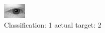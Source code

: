 \begin{figure}[h!]
\begin{center}
\includegraphics[width=0.60\columnwidth]{figures/ID345_class_1_target_2.png}
\end{center}
\caption{ Classification: 1 actual target: 2}
\label{fig:ID345_class_1_target_2}
\end{figure}
